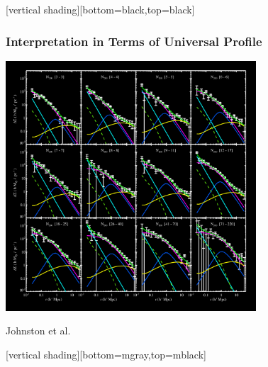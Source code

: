 \documentclass{beamer}
\begin{document}
{
    [vertical shading][bottom=black,top=black]


    \frame
    {
        \frametitle{Interpretation in Terms of Universal Profile}

        \begin{center}
            \includegraphics[trim=10 10 10 10,clip,width=0.7\textwidth]{Ngal200_DS_hfits_icolor.png}
        \end{center}
        \hfill {\color{gold} Johnston et al.}
    }

    [vertical shading][bottom=mgray,top=mblack]
}
\end{document}
